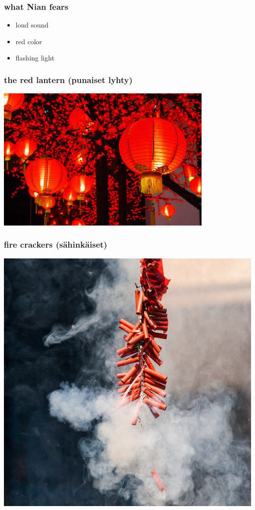 \documentclass[17pt]{beamer}
\begin{document}
\begin{frame}
  \frametitle{what Nian fears}

\begin{itemize}
\item loud sound
\item red color
\item flashing light
\end{itemize}
\end{frame}

\begin{frame}
  \frametitle{the red lantern (punaiset lyhty)}

  \begin{center}
    \includegraphics[width=0.8\textwidth]{./images/red-lantern}
  \end{center}
\end{frame}

\begin{frame}
  \frametitle{fire crackers (sähinkäiset)}
  \begin{center}
    \includegraphics[width=.7\textwidth]{./images/firework1}
  \end{center}
\end{frame}
\end{document}
